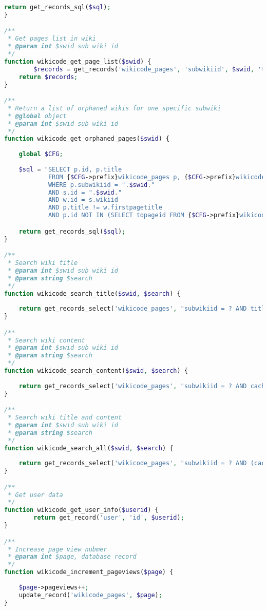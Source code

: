 \begin{lstlisting}[language=PHP]
    return get_records_sql($sql);
}

/**
 * Get pages list in wiki
 * @param int $swid sub wiki id
 */
function wikicode_get_page_list($swid) {
        $records = get_records('wikicode_pages', 'subwikiid', $swid, 'title ASC');
    return $records;
}

/**
 * Return a list of orphaned wikis for one specific subwiki
 * @global object
 * @param int $swid sub wiki id
 */
function wikicode_get_orphaned_pages($swid) {
	
	global $CFG;
    
    $sql = "SELECT p.id, p.title
            FROM {$CFG->prefix}wikicode_pages p, {$CFG->prefix}wikicode w , {$CFG->prefix}wikicode_subwikis s
            WHERE p.subwikiid = ".$swid."
            AND s.id = ".$swid."
            AND w.id = s.wikiid
            AND p.title != w.firstpagetitle
            AND p.id NOT IN (SELECT topageid FROM {$CFG->prefix}wikicode_links WHERE subwikiid = ".$swid.");";

    return get_records_sql($sql);
}

/**
 * Search wiki title
 * @param int $swid sub wiki id
 * @param string $search
 */
function wikicode_search_title($swid, $search) {
    
    return get_records_select('wikicode_pages', "subwikiid = ? AND title LIKE ?", $swid, '%'.$search.'%');
}

/**
 * Search wiki content
 * @param int $swid sub wiki id
 * @param string $search
 */
function wikicode_search_content($swid, $search) {
    
    return get_records_select('wikicode_pages', "subwikiid = ? AND cachedcontent LIKE ?", $swid, '%'.$search.'%');
}

/**
 * Search wiki title and content
 * @param int $swid sub wiki id
 * @param string $search
 */
function wikicode_search_all($swid, $search) {
    
    return get_records_select('wikicode_pages', "subwikiid = ? AND (cachedcontent LIKE ? OR title LIKE ?)", $swid, '%'.$search.'%', '%'.$search.'%');
}

/**
 * Get user data
 */
function wikicode_get_user_info($userid) {
        return get_record('user', 'id', $userid);
}

/**
 * Increase page view nubmer
 * @param int $page, database record
 */
function wikicode_increment_pageviews($page) {
    
    $page->pageviews++;
    update_record('wikicode_pages', $page);
}


\end{lstlisting}
